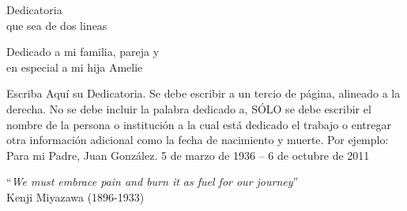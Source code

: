\thispagestyle{fancy}

\vspace{5cm}
\begin{flushright}
{{\sc Dedicatoria}\\
{\sc que sea de dos lineas}\\}
\end{flushright}

\begin{flushright}
{{\sc Dedicado a mi familia, pareja y }\\
{\sc en especial a mi hija Amelie}\\}
\end{flushright}


Escriba Aquí su Dedicatoria.
Se debe escribir a un tercio de página, alineado a la derecha.
No se debe incluir la palabra dedicado a, SÓLO se debe escribir el nombre de la persona o institución a la cual está dedicado el trabajo o entregar otra información adicional como la fecha de nacimiento y muerte.
Por ejemplo:
	Para mi Padre, Juan González.  
5 de marzo de 1936 – 6 de octubre de 2011
\vspace{-4cm} %



\vspace{12cm}
\begin{centering}
{{``{\it We must embrace pain and burn it as fuel for our journey}''}\\
{\sc Kenji Miyazawa (1896-1933)}\\}
\end{centering}



